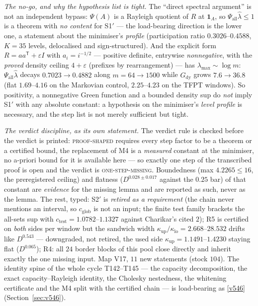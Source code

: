 \documentclass[11pt,a4paper]{article}
\begin{document}
\emph{The no-go, and why the hypothesis list is tight.} The ``direct spectral argument'' is not
an independent bypass: $\Psi(A)$ is a Rayleigh quotient of $R$ at $\mathbf 1_A$, so
$\Psi_{\mathrm{all}}\hat\lambda\le1$ is a theorem with \emph{no content} for S1$'$ --- the
load-bearing direction is the lower one, a statement about the minimiser's \emph{profile}
(participation ratio $0.3026$--$0.4588$, $K=35$ levels, delocalised and sign-structured). And
the explicit form $R=aa^{\mathsf T}+\varepsilon I$ with $a_i=i^{-1/2}$ --- positive definite,
entrywise \emph{nonnegative}, with the \emph{proved} density ceiling $4+\varepsilon$ (prefixes
by rearrangement) --- has $\lambda_{\max}\sim\log m$: $\Psi_{\mathrm{all}}\hat\lambda$ decays
$0.7023\to0.4882$ along $m=64\to1500$ while $G_{\mathrm{dy}}$ grows $7.6\to36.8$ (flat
$1.69$--$4.16$ on the Markovian control, $2.25$--$4.23$ on the TFPT windows). So positivity, a
nonnegative Green function and a bounded density sup do \emph{not} imply S1$'$ with any
absolute constant: a hypothesis on the minimiser's \emph{level profile} is necessary, and the
step list is not merely sufficient but tight.

\emph{The verdict discipline, as its own statement.} The verdict rule is checked before the
verdict is printed: \textsc{proof-shaped} requires every step factor to be a theorem or a
certified bound, the replacement of M4 is a \emph{measured} constant at the minimiser, no
a-priori bound for it is available here --- so exactly one step of the transcribed proof is
open and the verdict is \textsc{one-step-missing}. Boundedness (max $4.2265\le16$, the
preregistered ceiling) and flatness ($D^{0.028\pm0.017}$ against the $0.25$ bar) of that
constant are \emph{evidence} for the missing lemma and are reported as such, never as the
lemma. The rest, typed: S2$'$ is \emph{retired as a requirement} (the chain never mentions an
interval, so $c_{\mathrm{glob}}$ is not an input; the finite test family brackets the all-sets
sup with $c_{\mathrm{test}}=1.0782$--$1.1327$ against Charikar's cited $2$); R5 is certified on
\emph{both} sides per window but the sandwich width
$\kappa_{\mathrm{up}}/\kappa_{\mathrm{lo}}=2.668$--$28.532$ drifts like $D^{0.543}$ ---
downgraded, not retired, the used side $\kappa_{\mathrm{up}}=1.1491$--$1.4230$ staying flat
($D^{0.065}$); R4: all $24$ border blocks of this pool close directly and inherit exactly the
one missing input. Map V17, $11$ new statements (stock $104$). The identity spine of the whole
cycle T142--T145 --- the capacity decomposition, the exact capacity--Rayleigh identity, the
Cholesky nestedness, the whitening certificate and the M4 split with the certified chain --- is
load-bearing as \vref{v546} 
(Section~\ref{sec:v546}).
\end{document}
